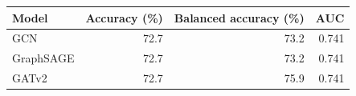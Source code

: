 \begin{tabular}{lrrr}\toprule Model & Accuracy (\%) & Balanced accuracy (\%) & AUC \\ \midrule
GCN & 72.7 & 73.2 & 0.741 \\
GraphSAGE & 72.7 & 73.2 & 0.741 \\
GATv2 & 72.7 & 75.9 & 0.741 \\
\bottomrule
\end{tabular}
